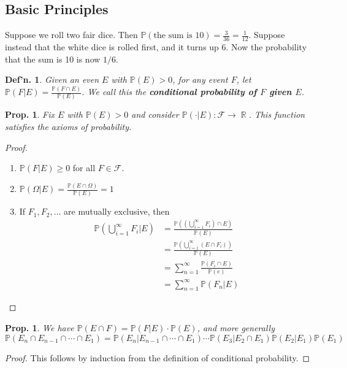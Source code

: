 \documentclass[12pt, a4paper]{book}
\DeclareMathOperator{\R}{\mathbb{R}}
\renewcommand{\Pr}{\mathbb{P}}
\newtheorem{definition}[theorem]{Def'n.}
\newtheorem{proposition}[theorem]{Prop.}
\theoremstyle{nonumberplain}
\newtheorem{proof}{Proof}
\begin{document}
\subsection{Basic Principles}
Suppose we roll two fair dice.
Then $\Pr(\text{the sum is 10})=\frac{3}{36}=\frac{1}{12}$.
Suppose instead that the white dice is rolled first, and it turns up $6$.
Now the probability that the sum is 10 is now $1/6$.
\begin{definition}
    Given an even $E$ with $\Pr(E)>0$, for any event $F$, let $\Pr(F|E)=\frac{\Pr(F\cap E)}{\Pr(E)}$.
    We call this the \textbf{conditional probability of $F$ given $E$}.
\end{definition}
\begin{proposition}
    Fix $E$ with $\Pr(E)>0$ and consider $\Pr(\cdot|E):\mathcal{F}\to\R$.
    This function satisfies the axioms of probability.
\end{proposition}
\begin{proof}
    \begin{enumerate}
        \item $\Pr(F|E)\geq0$ for all $F\in\mathcal{F}$.
        \item $\Pr(\Omega|E)=\frac{\Pr(E\cap\Omega)}{\Pr(E)}=1$
        \item If $F_1,F_2,\ldots$ are mutually exclusive, then
            \begin{align*}
                \Pr(\bigcup\limits_{i=1}^\infty F_i|E) &= \frac{\Pr( (\bigcup_{i=1}^\infty F_i)\cap E)}{\Pr(E)}\\
                                                      &= \frac{\Pr(\bigcup_{i=1}^\infty(E\cap F_i))}{\Pr(E)}\\
                                                      &= \sum\limits_{n=1}^\infty\frac{\Pr(F_i\cap E)}{\Pr(e)}\\
                                                      &= \sum\limits_{n=1}^\infty\Pr(F_n|E)
            \end{align*}
    \end{enumerate}
\end{proof}
\begin{proposition}
    We have $\Pr(E\cap F)=\Pr(F|E)\cdot \Pr(E)$, and more generally
    \[\Pr(E_n\cap E_{n-1}\cap\cdots\cap E_1)=\Pr(E_n|E_{n-1}\cap\cdots\cap E_1)\cdots\Pr(E_3|E_2\cap E_1)\Pr(E_2|E_1)\Pr(E_1)\]
\end{proposition}
\begin{proof}
    This follows by induction from the definition of conditional probability.
\end{proof}
\end{document}
